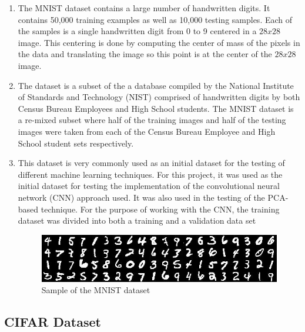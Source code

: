 \documentclass[12pt, titlepage]{article}
\begin{document}
\begin{enumerate}
  \item The MNIST dataset contains a large number of handwritten digits. It contains 50,000 training
        examples as well as 10,000 testing samples. Each of the samples is a single handwritten digit
        from 0 to 9 centered in a $28x28$ image. This centering is done by computing the center of mass
        of the pixels in the data and translating the image so this point is at the center of the $28x28$
        image. 
  \item The dataset is a subset of the a database compiled by the National Institute of Standards and Technology
        (NIST) comprised of handwritten digits by both Census Bureau Employees and High School students. The MNIST 
        dataset is a re-mixed subset where half of the training images and half of the testing images were taken 
        from each of the Census Bureau Employee and High School student sets respectively.
  \item This dataset is very commonly used as an initial dataset for the testing of different machine learning
        techniques. For this project, it was used as the initial dataset for testing the implementation of the
        convolutional neural network (CNN) approach used. It was also used in the testing of the PCA-based technique.
        For the purpose of working with the CNN, the training dataset was divided into both a training and a validation
        data set
        \FloatBarrier
        \begin{figure}[h]
          \caption{Sample of the MNIST dataset}
          \centering
          \includegraphics[scale=0.5]{images/mnist_dataset_example}
        \end{figure}
        \FloatBarrier
\end{enumerate}

\subsection{CIFAR Dataset}
\end{document}
